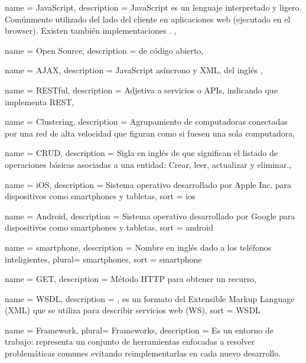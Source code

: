 \newpage

 {
  name = {JavaScript},
  description = {JavaScript es un lenguaje interpretado y ligero. Comúnmente utilizado del lado del cliente en aplicaciones web (ejecutado en el browser). Existen también implementaciones . },
}


 {
  name = {Open Source},
  description = { de código abierto},
}

 {
  name = {AJAX},
  description = {JavaScript asíncrono y XML, del inglés  },
}

 {
  name = {RESTful},
  description = {Adjetiva a servicios o APIs, indicando que implementa REST},
}

 {
  name = {Clustering},
  description = {Agrupamiento de computadoras conectadas por una red de alta velocidad que figuran como si fuesen una sola computadora},
}

 {
  name = {CRUD},
  description = {Sigla en inglés de  que significan el listado de operaciones básicas asociadas a una entidad: Crear, leer, actualizar y eliminar.},
}

 {
  name = {iOS},
  description = {Sistema operativo desarrollado por Apple Inc. para dispositivos
  como smartphones y tabletas}, sort = {ios}
}

 {
  name = {Android},
  description = {Sistema operativo desarrollado por Google para dispositivos
  como smartphones y tabletas},
  sort = {android}
}

 {
  name = {smartphone},
  description = {Nombre en inglés dado a los teléfonos inteligientes},
  plural= {smartphones},
  sort = {smartphone}
}

 {
  name = {GET},
  description = {Método HTTP para obtener un recurso},
}

 {
  name = {WSDL},
  description = {, es un formato del Extensible Markup Language (XML) que se utiliza para describir servicios web (WS)},
  sort = {WSDL}
}

 {
  name = {Framework},
  plural= {Frameworks},
  description = {Es un entorno de trabajo: representa un conjunto de herramientas enfocadas a resolver problemáticas comunes evitando reimplementarlas en cada nuevo desarrollo.}
}

